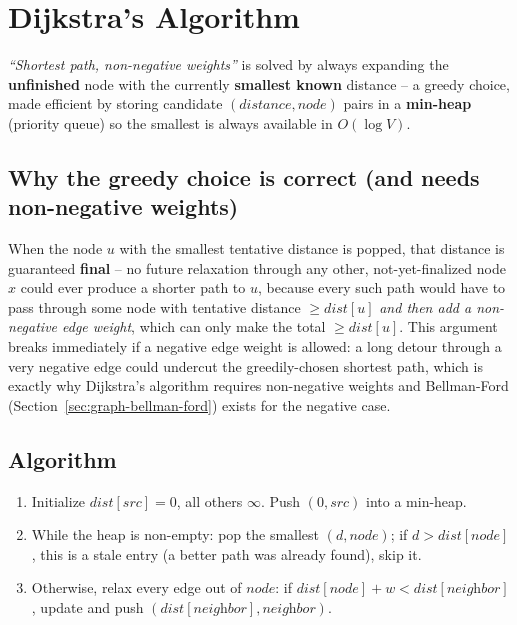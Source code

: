 \section{Dijkstra's Algorithm}
\label{sec:graph-dijkstra}


\begin{patternbox}
\emph{``Shortest path, non-negative weights''} is solved by always
expanding the \textbf{unfinished} node with the currently
\textbf{smallest known} distance -- a greedy choice, made efficient by
storing candidate $(\textit{distance}, \textit{node})$ pairs in a
\textbf{min-heap} (priority queue) so the smallest is always available
in $O(\log V)$.
\end{patternbox}

\subsection*{Why the greedy choice is correct (and needs non-negative weights)}

When the node $u$ with the smallest tentative distance is popped, that
distance is guaranteed \textbf{final} -- no future relaxation through
any other, not-yet-finalized node $x$ could ever produce a shorter path
to $u$, because every such path would have to pass through some node
with tentative distance $\ge \textit{dist}[u]$ \emph{and then add a
non-negative edge weight}, which can only make the total $\ge
\textit{dist}[u]$. This argument breaks immediately if a negative edge
weight is allowed: a long detour through a very negative edge could
undercut the greedily-chosen shortest path, which is exactly why
Dijkstra's algorithm requires non-negative weights and Bellman-Ford
(Section~\ref{sec:graph-bellman-ford}) exists for the negative case.

\subsection*{Algorithm}

\begin{enumerate}
  \item Initialize $\textit{dist}[\textit{src}]=0$, all others
        $\infty$. Push $(0, \textit{src})$ into a min-heap.
  \item While the heap is non-empty: pop the smallest
        $(\textit{d}, \textit{node})$; if $\textit{d} >
        \textit{dist}[\textit{node}]$, this is a stale entry (a better
        path was already found), skip it.
  \item Otherwise, relax every edge out of $\textit{node}$: if
        $\textit{dist}[\textit{node}] + w < \textit{dist}[\textit{neighbor}]$,
        update and push $(\textit{dist}[\textit{neighbor}],
        \textit{neighbor})$.
\end{enumerate}

